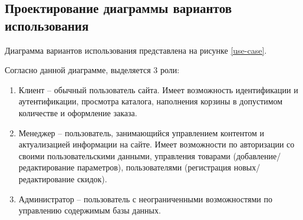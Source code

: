 \subsection{Проектирование диаграммы вариантов использования}\label{subsec:design-use-case}\indent

Диаграмма вариантов использования представлена на рисунке \ref{use-case}.


Согласно данной диаграмме, выделяется 3 роли:
\begin{enumerate}
    \item Клиент – обычный пользователь сайта. 
    Имеет возможность идентификации и аутентификации, просмотра каталога, наполнения корзины в допустимом количестве и оформление заказа.
    \item Менеджер – пользователь, занимающийся управлением контентом и актуализацией информации на сайте. 
    Имеет возможности по авторизации со своими пользовательскими данными, управления товарами (добавление/редактирование параметров), пользователями (регистрация новых/редактирование скидок).
    \item Администратор – пользователь с неограниченными возможностями по управлению содержимым базы данных.
\end{enumerate}